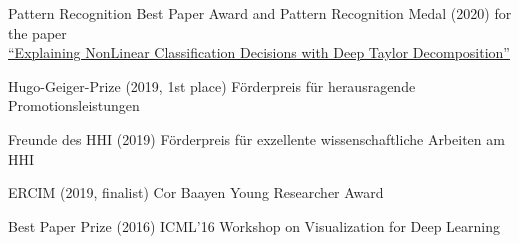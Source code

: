 \documentclass[10pt,a4paper]{article} %
\begin{document}

\inlineheadsection
{Pattern Recognition Best Paper Award and Pattern Recognition Medal (2020)}
{
    for the paper\\
    \href{https://doi.org/10.1016/j.patcog.2016.11.008}{\qquad ``Explaining NonLinear Classification Decisions with Deep Taylor Decomposition''}
}

\vspace{5pt}
\inlineheadsection %
{Hugo-Geiger-Prize (2019, 1st place)}
{
    F\"orderpreis f\"ur herausragende Promotionsleistungen
}

\vspace{5pt}
\inlineheadsection %
{Freunde des HHI (2019)}
{
    F\"orderpreis f\"ur exzellente wissenschaftliche Arbeiten am HHI
}

\vspace{5pt}
\inlineheadsection %
{ERCIM (2019, finalist)}
{
    Cor Baayen Young Researcher Award
}

\vspace{5pt}
\inlineheadsection %
{Best Paper Prize (2016)}
{
    ICML'16 Workshop on Visualization for Deep Learning
}


\spacedhrule{1.6em}{-0.4em} %
\end{document}
